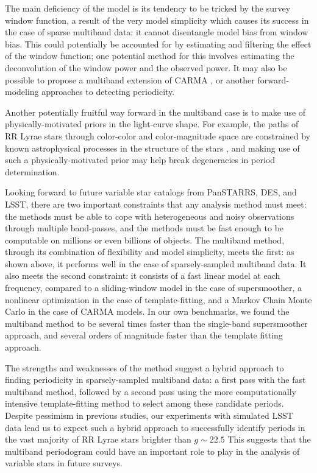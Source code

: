 \documentclass[12pt,preprint]{aastex}
\begin{document}
The main deficiency of the model is its tendency to be tricked by the survey window function, a result of the very model simplicity which causes its success in the case of sparse multiband data: it cannot disentangle model bias from window bias.
This could potentially be accounted for by estimating and filtering the effect of the window function; one potential method for this involves estimating the deconvolution of the window power and the observed power.
It may also be possible to propose a multiband extension of CARMA \citep{Kelly14},
or another forward-modeling approaches to detecting periodicity.

Another potentially fruitful way forward in the multiband case is to make use of physically-motivated priors in the light-curve shape. For example, the paths of RR Lyrae stars through color-color and color-magnitude space are constrained by known astrophysical processes in the structure of the stars \citep[e.g., see Fig. 5 in][]{Szabo2014}, and making use of such a physically-motivated prior may help break degeneracies in period determination.

Looking forward to future variable star catalogs from PanSTARRS, DES, and LSST, there are two important constraints that any analysis method must meet: the methods must be able to cope with heterogeneous and noisy observations through multiple band-passes, and the methods must be fast enough to be computable on millions or even billions of objects.
The multiband method, through its combination of flexibility and model simplicity, meets the first: as shown above, it performs well in the case of sparsely-sampled multiband data.
It also meets the second constraint: it consists of a fast linear model at each frequency, compared to a sliding-window model in the case of supersmoother, a nonlinear optimization in the case of template-fitting, and a Markov Chain Monte Carlo in the case of CARMA models.
In our own benchmarks, we found the multiband method to be several times faster than the single-band supersmoother approach, and several orders of magnitude faster than the template fitting approach.

The strengths and weaknesses of the method suggest a hybrid approach to finding periodicity in sparsely-sampled multiband data: a first pass with the fast multiband method, followed by a second pass using the more computationally intensive template-fitting method to select among these candidate periods.
Despite pessimism in previous studies, our experiments with simulated LSST data lead us to expect such a hybrid approach to successfully identify periods in the vast majority of RR Lyrae stars brighter than $g\sim 22.5$
This suggests that the multiband periodogram could have an important role to play in the analysis of variable stars in future surveys.
\end{document}
